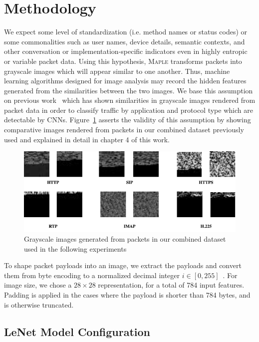 \section{Methodology}

We expect some level of standardization (i.e. method names or status codes) or some commonalities such as user names, device details, semantic contexts, and other conversation or implementation-specific indicators even in highly entropic or variable packet data. Using this hypothesis, \textsc{Maple} transforms packets into grayscale images which will appear similar to one another. Thus, machine learning algorithms designed for image analysis may record the hidden features generated from the similarities between the two images. We base this assumption on previous work~\cite{lim2019network} which has shown similarities in grayscale images rendered from packet data in order to classify traffic by application and protocol type which are detectable by CNNs. Figure~\ref{fig:grayscale} asserts the validity of this assumption by showing comparative images rendered from packets in our combined dataset previously used and explained in detail in chapter 4 of this work.

\begin{figure} [ht!]
\includegraphics[width=\linewidth]{chapters/5/img/grayscaleimages.drawio.png}
\caption{Grayscale images generated from packets in our combined dataset used in the following experiments}
\label{fig:grayscale}
\end{figure}

To shape packet payloads into an image, we extract the payloads and convert them from byte encoding to a normalized decimal integer $i \in [0,255]$~\cite{jo2020packet}. For image size, we chose a $28\times28$ representation, for a total of 784 input features. Padding is applied in the cases where the payload is shorter than 784 bytes, and is otherwise truncated.

\subsection{LeNet Model Configuration}

